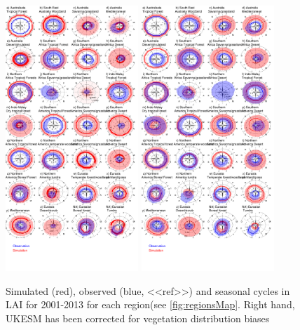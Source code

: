 \begin{figure}[t]
        \includegraphics[width=5cm]{figs/LAI/fire_var_seasonality-TS-control-lai.png}
        \includegraphics[width=5cm]{figs/LAI/fire_var_seasonality-TS-obsVegDist-lai.png}
    
    \caption{Simulated (red), observed (blue, <<ref>>) and seasonal cycles in LAI for 2001-2013 for each region(see \ref{fig:regionsMap}. Right hand, UKESM has been corrected for vegetation distribution biases \label{fig:LAIseasonalTS}}
\end{figure}

